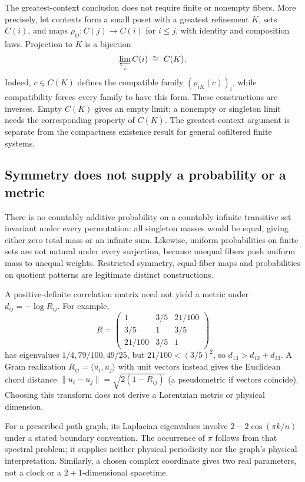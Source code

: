 The greatest-context conclusion does not require finite or nonempty fibers. More precisely, let contexts form a small poset with a greatest refinement $K$, sets $C(i)$, and maps $\rho_{ij}:C(j)\to C(i)$ for $i\le j$, with identity and composition laws. Projection to $K$ is a bijection
\[
 \varprojlim_i C(i)\;\cong\; C(K).
\]
Indeed, $c\in C(K)$ defines the compatible family $(\rho_{iK}(c))_i$, while compatibility forces every family to have this form. These constructions are inverses. Empty $C(K)$ gives an empty limit; a nonempty or singleton limit needs the corresponding property of $C(K)$. The greatest-context argument is separate from the compactness existence result for general cofiltered finite systems.

\subsection{Symmetry does not supply a probability or a metric}
\label{str:geometry}
There is no countably additive probability on a countably infinite transitive set invariant under every permutation: all singleton masses would be equal, giving either zero total mass or an infinite sum. Likewise, uniform probabilities on finite sets are not natural under every surjection, because unequal fibers push uniform mass to unequal weights. Restricted symmetry, equal-fiber maps and probabilities on quotient patterns are legitimate distinct constructions.

A positive-definite correlation matrix need not yield a metric under $d_{ij}=-\log R_{ij}$. For example,
\[
 R=\begin{pmatrix}1&3/5&21/100\\3/5&1&3/5\\21/100&3/5&1\end{pmatrix}
\]
has eigenvalues $1/4,79/100,49/25$, but $21/100<(3/5)^2$, so $d_{13}>d_{12}+d_{23}$. A Gram realization $R_{ij}=\langle u_i,u_j\rangle$ with unit vectors instead gives the Euclidean chord distance $\|u_i-u_j\|=\sqrt{2(1-R_{ij})}$ (a pseudometric if vectors coincide). Choosing this transform does not derive a Lorentzian metric or physical dimension.

For a prescribed path graph, its Laplacian eigenvalues involve $2-2\cos(\pi k/n)$ under a stated boundary convention. The occurrence of $\pi$ follows from that spectral problem; it supplies neither physical periodicity nor the graph's physical interpretation. Similarly, a chosen complex coordinate gives two real parameters, not a clock or a $2+1$-dimensional spacetime.

